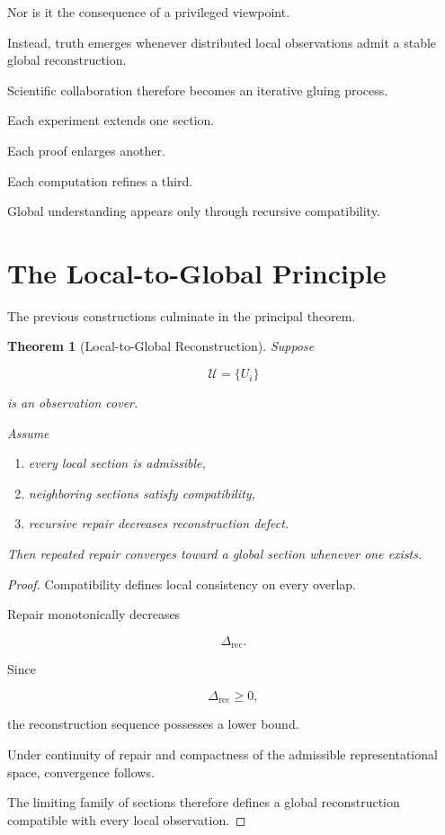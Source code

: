 \documentclass[11pt,oneside]{book}
\numberwithin{equation}{chapter}
\theoremstyle{definition}
\theoremstyle{plain}
\newtheorem{theorem}[definition]{Theorem}
\begin{document}
Nor is it the consequence of a privileged viewpoint.

Instead, truth emerges whenever distributed local observations admit a stable
global reconstruction.

Scientific collaboration therefore becomes an iterative gluing process.

Each experiment extends one section.

Each proof enlarges another.

Each computation refines a third.

Global understanding appears only through recursive compatibility.

\section{The Local-to-Global Principle}

The previous constructions culminate in the principal theorem.

\begin{theorem}[Local-to-Global Reconstruction]

Suppose

\[
\mathcal{U}
=
\{
U_i
\}
\]

is an observation cover.

Assume

\begin{enumerate}
\item every local section is admissible,
\item neighboring sections satisfy compatibility,
\item recursive repair decreases reconstruction defect.
\end{enumerate}

Then repeated repair converges toward a global section whenever one exists.

\end{theorem}

\begin{proof}

Compatibility defines local consistency on every overlap.

Repair monotonically decreases

\[
\Delta_{\mathrm{rec}}.
\]

Since

\[
\Delta_{\mathrm{rec}}
\ge
0,
\]

the reconstruction sequence possesses a lower bound.

Under continuity of repair and compactness of the admissible representational
space, convergence follows.

The limiting family of sections therefore defines a global reconstruction
compatible with every local observation.

\end{proof}
\end{document}

